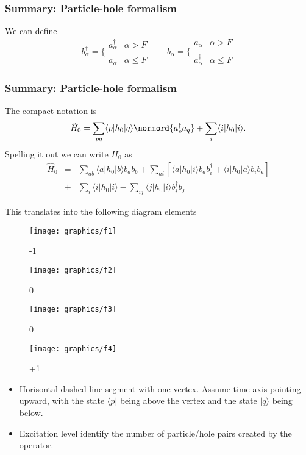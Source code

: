 \documentclass[compress]{beamer}
\newcommand*{\ket}[1]{|#1\rangle}
\newcommand*{\bra}[1]{\langle#1|}
\newcommand{\element}[3]
        {\bra{#1}#2\ket{#3}}
\begin{document}
\frame
{
  \frametitle{Summary: Particle-hole formalism}
\begin{small}
{\scriptsize
We can define
\[
	b_\alpha^\dagger = \Bigg\{ \begin{array}{ll}
		a_\alpha^\dagger & \alpha > F \\
		\\
		a_\alpha & \alpha \leq F
	\end{array} \qquad 
	b_\alpha = \Bigg\{ \begin{array}{ll}
		a_\alpha & \alpha > F \\
		\\
		 a_\alpha^\dagger & \alpha \leq F
	\end{array} 
\]
}
\end{small}
}


\frame
{
  \frametitle{Summary: Particle-hole formalism}
\begin{small}
{\scriptsize
The compact notation is 
\[
        \hat{H}_0 = \sum_{pq} \element{p}{h_0}{q} \normord{a^\dagger_p a_q} +\sum_{i} \element{i}{h_0}{i}.
\]
Spelling it out we can write $H_0$ as 
\begin{eqnarray}
	\hat{H}_0 &=& \sum_{ab} \element{a}{h_0}{b}  b_a^\dagger b_b +
		\sum_{ai} \left[
		\element{a}{h_0}{i} b_a^\dagger b_i^\dagger + 
		\element{i}{h_0}{a} b_i  b_a \right] \nonumber \\
	&+& \sum_{i} \element{i}{h_0}{i} - 
		\sum_{ij} \element{j}{h_0}{i}
		b_i^\dagger b_j \nonumber
\end{eqnarray}
}
\end{small}
}

\begin{frame}{This translates into the following diagram elements}
    \renewcommand{\figurename}{Level}
    \begin{figure}
    \centering
    \parbox{0.20\textwidth}{
            \centering
            \texttt{[image: graphics/f1]}
            \caption{-1}
        }
        \parbox{0.20\textwidth}{
            \centering
            \texttt{[image: graphics/f2]}
            \caption{0}
        }
        \parbox{0.20\textwidth}{
            \centering
            \texttt{[image: graphics/f3]}
            \caption{0}
        }
        \parbox{0.20\textwidth}{
            \centering
            \texttt{[image: graphics/f4]}
            \caption{+1}
        }
    \end{figure}

    \begin{itemize}
        \item Horisontal dashed line segment with one vertex. Assume time axis pointing upward, with 
the state $\langle p|$ being above the vertex and the state $|q\rangle$ being below. 
        \item Excitation level identify the number of particle/hole pairs created by the operator.
    \end{itemize}
\end{frame}
\end{document}
